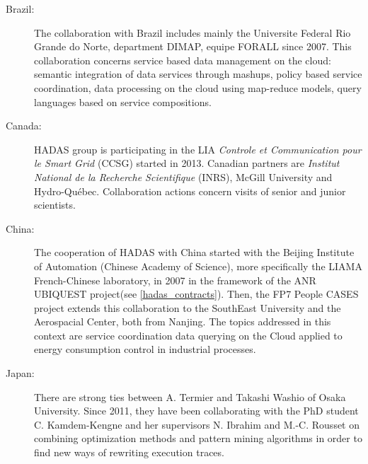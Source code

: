\begin{description}

\item[Brazil:] 
The collaboration with Brazil includes mainly the Universite Federal Rio Grande do Norte, department DIMAP,  equipe FORALL since 2007. This collaboration concerns service based data management on the cloud: semantic integration of data services through mashups, policy based service coordination, data processing on the cloud using map-reduce models, query languages based on service compositions.  

\item[Canada:]
HADAS group is participating in the LIA {\em Controle et Communication pour le Smart Grid} (CCSG) started in 2013. Canadian partners are {\em Institut National de la Recherche Scientifique} (INRS), McGill University and Hydro-Qu\'ebec. Collaboration actions concern visits of senior and junior scientists.

\item[China:] The cooperation of HADAS with China started with the Beijing Institute of Automation (Chinese Academy of Science), more specifically the LIAMA French-Chinese laboratory, in 2007 in the framework of the ANR UBIQUEST project(see \ref{hadas_contracts}). Then, the FP7 People CASES project extends this collaboration to the SouthEast University and the Aerospacial Center, both from Nanjing. The topics addressed in this context are service coordination data querying on the  Cloud applied to energy consumption control in industrial processes. 

\item[Japan:] 
There are strong ties between A. Termier and Takashi Washio of Osaka University. Since 2011, they have been collaborating with the PhD student C. Kamdem-Kengne and her supervisors N. Ibrahim and M.-C. Rousset on combining optimization methods and pattern mining algorithms in order to find new ways of rewriting execution traces.


\end{description}
